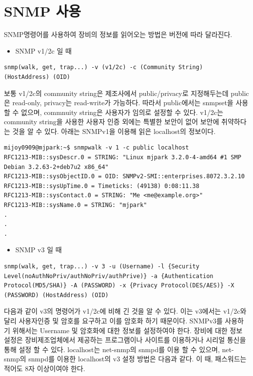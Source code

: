 \documentclass[11pt
  , a4paper
  , article
  , oneside
]{memoir}
\begin{document}
\section{SNMP 사용}
SNMP명령어를 사용하여 장비의 정보를 읽어오는 방법은 버전에 따라 달라진다.

\begin{itemize}
\item SNMP v1/2c 일 때
\end{itemize}

\begin{lstlisting}[style=termstyle]
snmp(walk, get, trap...) -v (v1/2c) -c (Community String) (HostAddress) (OID) 
\end{lstlisting}

보통 v1/2c의 community string은 제조사에서 public/privacy로 지정해두는데 public은 read-only, privacy는 read-write가 가능하다. 따라서 public에서는 snmpset을 사용할 수 없으며, commnuity string은 사용자가 임의로 설정할 수 있다. v1/2c는 community string을 사용한 사용자 인증 외에는 특별한 보안이 없어 보안에 취약하다는 것을 알 수 있다. 아래는 SNMPv1을 이용해 읽은 localhost의 정보이다.
\begin{lstlisting}[style=termstyle]
mijoy0909@mjpark:~$ snmpwalk -v 1 -c public localhost
RFC1213-MIB::sysDescr.0 = STRING: "Linux mjpark 3.2.0-4-amd64 #1 SMP Debian 3.2.63-2+deb7u2 x86_64"
RFC1213-MIB::sysObjectID.0 = OID: SNMPv2-SMI::enterprises.8072.3.2.10
RFC1213-MIB::sysUpTime.0 = Timeticks: (49138) 0:08:11.38
RFC1213-MIB::sysContact.0 = STRING: "Me <me@example.org>"
RFC1213-MIB::sysName.0 = STRING: "mjpark"
.
.
.
\end{lstlisting}

\begin{itemize}
\item SNMP v3 일 때
\end{itemize}

\begin{lstlisting}[style=termstyle]
snmp(walk, get, trap...) -v 3 -u (Username) -l {Security Level(noAuthNoPriv/authNoPriv/authPrive)} -a {Authentication Protocol(MD5/SHA)} -A (PASSWORD) -x {Privacy Protocol(DES/AES)} -X (PASSWORD) (HostAddress) (OID) 
\end{lstlisting}

다음과 같이 v3의 명령어가 v1/2c에 비해 긴 것을 알 수 있다. 이는 v3에서는 v1/2c와 달리 사용자인증 및 암호를 요구하고 이를 암호화 하기 때문이다. 
SNMPv3를 사용하기 위해서는 Username 및 암호화에 대한 정보를 설정하여야 한다. 장비에 대한 정보 설정은 장비제조업체에서 제공하는 프로그램이나 사이트를 이용하거나 시리얼 통신을 통해 설정 할 수 있다. localhost는 net-snmp의 snmpd를 이용 할 수 있으며, net-snmp의 snmpd를 이용한 localhost의 v3 설정 방법은 다음과 같다. 이 때, 패스워드는 적어도 8자 이상이여야 한다.
\end{document}

